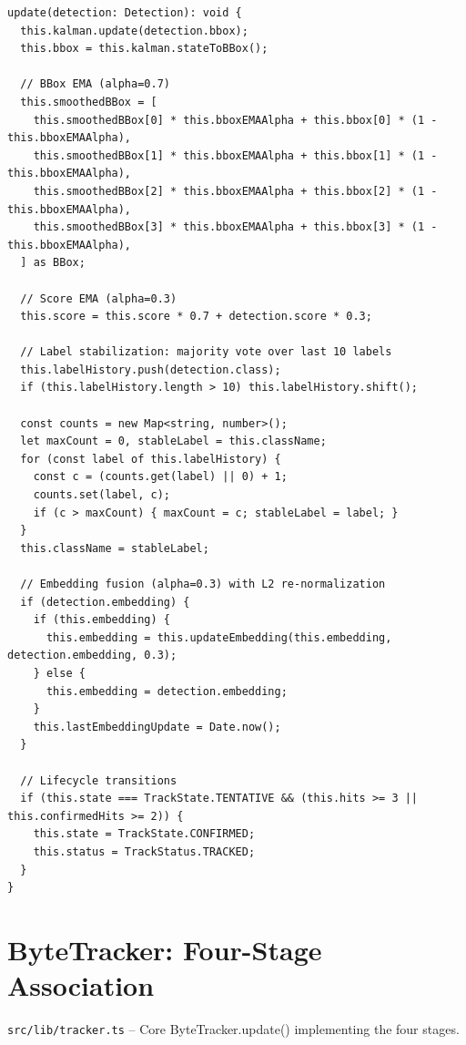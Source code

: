 \begin{lstlisting}[style=typescript, caption={Track.update()}, label={lst:track-update}]
update(detection: Detection): void {
  this.kalman.update(detection.bbox);
  this.bbox = this.kalman.stateToBBox();

  // BBox EMA (alpha=0.7)
  this.smoothedBBox = [
    this.smoothedBBox[0] * this.bboxEMAAlpha + this.bbox[0] * (1 - this.bboxEMAAlpha),
    this.smoothedBBox[1] * this.bboxEMAAlpha + this.bbox[1] * (1 - this.bboxEMAAlpha),
    this.smoothedBBox[2] * this.bboxEMAAlpha + this.bbox[2] * (1 - this.bboxEMAAlpha),
    this.smoothedBBox[3] * this.bboxEMAAlpha + this.bbox[3] * (1 - this.bboxEMAAlpha),
  ] as BBox;

  // Score EMA (alpha=0.3)
  this.score = this.score * 0.7 + detection.score * 0.3;

  // Label stabilization: majority vote over last 10 labels
  this.labelHistory.push(detection.class);
  if (this.labelHistory.length > 10) this.labelHistory.shift();

  const counts = new Map<string, number>();
  let maxCount = 0, stableLabel = this.className;
  for (const label of this.labelHistory) {
    const c = (counts.get(label) || 0) + 1;
    counts.set(label, c);
    if (c > maxCount) { maxCount = c; stableLabel = label; }
  }
  this.className = stableLabel;

  // Embedding fusion (alpha=0.3) with L2 re-normalization
  if (detection.embedding) {
    if (this.embedding) {
      this.embedding = this.updateEmbedding(this.embedding, detection.embedding, 0.3);
    } else {
      this.embedding = detection.embedding;
    }
    this.lastEmbeddingUpdate = Date.now();
  }

  // Lifecycle transitions
  if (this.state === TrackState.TENTATIVE && (this.hits >= 3 || this.confirmedHits >= 2)) {
    this.state = TrackState.CONFIRMED;
    this.status = TrackStatus.TRACKED;
  }
}
\end{lstlisting}

\section{ByteTracker: Four-Stage Association}
\label{sec:code-bytetrack}
\texttt{src/lib/tracker.ts} -- Core ByteTracker.update() implementing the four stages.

